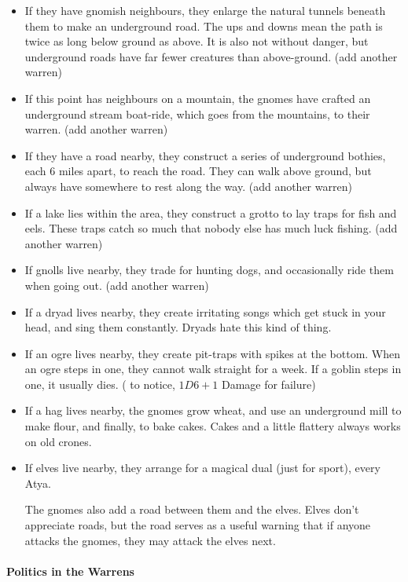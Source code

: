 \begin{multicols}{2}
\begin{itemize}
  \item
  If they have gnomish neighbours, they enlarge the natural tunnels beneath them to make an underground road.
  The ups and downs mean the path is twice as long below ground as above.
  It is also not without danger, but underground roads have far fewer creatures than above-ground.
  (add another warren)
  \item
  If this point has neighbours on a mountain, the gnomes have crafted an underground stream boat-ride, which goes from the mountains, to their warren.
  (add another warren)
  \item
  If they have a road nearby, they construct a series of underground bothies, each 6 miles apart, to reach the road.  They can walk above ground, but always have somewhere to rest along the way. (add another warren)
  \item
  If a lake lies within the area, they construct a grotto to lay traps for fish and eels.
  These traps catch so much that nobody else has much luck fishing. (add another warren)
  \item
  If gnolls live nearby, they trade for hunting dogs, and occasionally ride them when going out. (add another warren)
  \item
  If a dryad lives nearby, they create irritating songs which get stuck in your head, and sing them constantly.  Dryads hate this kind of thing.
  \item
  If an ogre lives nearby, they create pit-traps with spikes at the bottom.
  When an ogre steps in one, they cannot walk straight for a week.
  If a goblin steps in one, it usually dies.
  ( \tn[12] to notice, $1D6+1$ Damage for failure)
  \item
  If a hag lives nearby, the gnomes grow wheat, and use an underground mill to make flour, and finally, to bake cakes.  Cakes and a little flattery always works on old crones.
  \item
  If elves live nearby, they arrange for a magical dual (just for sport), every \gls{Atya}.

  The gnomes also add a road between them and the elves.
  Elves don't appreciate roads, but the road serves as a useful warning that if anyone attacks the gnomes, they may attack the elves next.
\end{itemize}

\paragraph{Politics in the Warrens}


\end{multicols}
